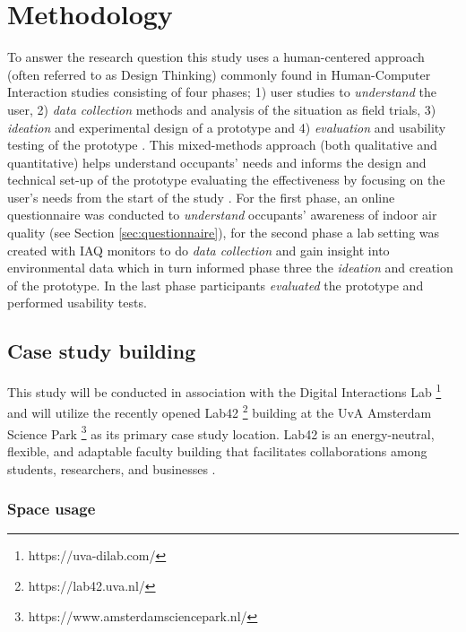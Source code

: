 \section{Methodology}
\label{sec:methodology}

To answer the research question this study uses a human-centered approach (often referred to as Design Thinking) commonly found in Human-Computer Interaction studies consisting of four phases; 1) user studies to \textit{understand} the user, 2) \textit{data collection} methods and analysis of the situation as field trials, 3) \textit{ideation} and experimental design of a prototype and 4) \textit{evaluation} and usability testing of the prototype \cite{jonathan_lazar_research_2017, zimmerman_research_2007}. This mixed-methods approach (both qualitative and quantitative)  helps understand occupants' needs and informs the design and technical set-up of the prototype evaluating the effectiveness by focusing on the user's needs from the start of the study \cite{rogers_moving_2017}. For the first phase, an online questionnaire was conducted to \textit{understand} occupants' awareness of indoor air quality (see Section \ref{sec:questionnaire}), for the second phase a lab setting was created with IAQ monitors to do \textit{data collection} and gain insight into environmental data which in turn informed phase three the \textit{ideation} and creation of the prototype. In the last phase participants \textit{evaluated} the prototype and performed usability tests.

\subsection{Case study building}

This study will be conducted in association with the Digital Interactions Lab \footnote{https://uva-dilab.com/} and will utilize the recently opened Lab42 \footnote{https://lab42.uva.nl/} building at the UvA Amsterdam Science Park \footnote{https://www.amsterdamsciencepark.nl/} as its primary case study location. Lab42 is an energy-neutral, flexible, and adaptable faculty building that facilitates collaborations among students, researchers, and businesses \cite{benthem_2022}. 

\subsubsection{Space usage}

